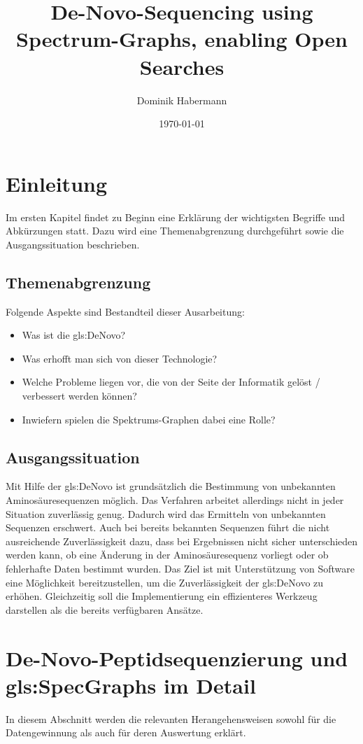 \documentclass[a4paper, 12pt]{article}
\title{De-Novo-Sequencing using Spectrum-Graphs, enabling Open Searches}
\author{Dominik Habermann}
\date{\today}
\begin{document}
\maketitle

\section{Einleitung}
Im ersten Kapitel findet zu Beginn eine Erklärung der wichtigsten Begriffe und Abkürzungen statt. Dazu wird eine Themenabgrenzung durchgeführt sowie die Ausgangssituation beschrieben.

\printnoidxglossaries

\subsection{Themenabgrenzung}
Folgende Aspekte sind Bestandteil dieser Ausarbeitung:
\begin{itemize}
   \item Was ist die \gls{gls:DeNovo}?
   \item Was erhofft man sich von dieser Technologie?
   \item Welche Probleme liegen vor, die von der Seite der Informatik gelöst / verbessert werden können?
   \item Inwiefern spielen die Spektrums-Graphen dabei eine Rolle?
\end{itemize}

\subsection{Ausgangssituation}
Mit Hilfe der \gls{gls:DeNovo} ist grundsätzlich die Bestimmung von unbekannten Aminosäuresequenzen möglich. Das Verfahren arbeitet allerdings nicht in jeder Situation zuverlässig genug. Dadurch wird das Ermitteln von unbekannten Sequenzen erschwert. Auch bei bereits bekannten Sequenzen führt die nicht ausreichende Zuverlässigkeit dazu, dass bei Ergebnissen nicht sicher unterschieden werden kann, ob eine Änderung in der Aminosäuresequenz vorliegt oder ob fehlerhafte Daten bestimmt wurden.
Das Ziel ist mit Unterstützung von Software eine Möglichkeit bereitzustellen, um die Zuverlässigkeit der \gls{gls:DeNovo} zu erhöhen. Gleichzeitig soll die Implementierung ein effizienteres Werkzeug darstellen als die bereits verfügbaren Ansätze.


\section{De-Novo-Peptidsequenzierung und \glspl{gls:SpecGraph} im Detail}
In diesem Abschnitt werden die relevanten Herangehensweisen sowohl für die Datengewinnung als auch für deren Auswertung erklärt.
\end{document}
